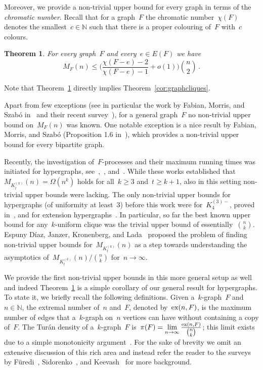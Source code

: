 \documentclass[reqno, 12pt]{amsart}
\numberwithin{equation}{section}
\numberwithin{figure}{section}
\theoremstyle{plain}
\newtheorem{theorem}{Theorem}[section]
\theoremstyle{note}
\theoremstyle{remark}
\def\ex{\text{\rm ex}}
\begin{document}
    Moreover, we provide a non-trivial upper bound for every graph in terms of the \textit{chromatic number}.
    Recall that for a graph~$F$ the chromatic number~$\chi(F)$ denotes the smallest~$c\in\mathds{N}$ such that there is a proper colouring of~$F$ with~$c$ colours.

    \begin{theorem}\label{thm:graphs}
        For every graph~$F$ and every~$e\in E(F)$ we have 
        \begin{equation*}
         M_F(n)\leq\bigg(\frac{\chi(F-e)-2}{\chi(F-e)-1}+o(1)\bigg)\binom{n}{2}\,.
        \end{equation*}
	\end{theorem}
    Note that Theorem~\ref{thm:graphs} directly implies Theorem~\ref{cor:graphcliques}.

    Apart from few exceptions (see in particular the work by Fabian, Morris, and Szab\'o in~\cite{FMS:25} and their recent survey~\cite{FMS:26}), for a general graph~$F$ no non-trivial upper bound on~$M_F(n)$ was known.
    One notable exception is a nice result by Fabian, Morris, and Szab\'o (Proposition 1.6 in~\cite{FMS:2508}), which provides a non-trivial upper bound for every bipartite graph.
    
	Recently, the investigation of~$F$-processes and their maximum running times was initiated for hypergraphs, see~\cite{NR:23},~\cite{HL:24}, and~\cite{EJKL:24}.
    While these works established that~$M_{K^{(k)}_t}(n)=\Omega(n^k)$ holds for all~$k\geq3$ and~$t\geq k+1$, also in this setting non-trivial upper bounds were lacking.
    The only non-trivial upper bounds for hypergraphs (of uniformity at least~$3$) before this work were for~$K_4^{(3)-}$, proved in~\cite{EJKL:24}, and for extension hypergraphs~\cite{LSZ:26}.
    In particular, so far the best known upper bound for any~$k$-uniform clique was the trivial upper bound of essentially~$\binom{n}{k}$.
    Espuny D\'iaz, Janzer, Kronenberg, and Lada~\cite{EJKL:24} proposed the problem of finding non-trivial upper bounds for~$M_{K^{(k)}_t}(n)$ as a step towards understanding the asymptotics of~$M_{K^{(k)}_t}(n)/\binom{n}{k}$ for~$n\to\infty$.
    
    We provide the first non-trivial upper bounds in this more general setup as well and indeed Theorem~\ref{thm:graphs} is a simple corollary of our general result for hypergraphs.
    To state it, we briefly recall the following definitions.
    Given a~$k$-graph~$F$ and~$n\in\mathds{N}$, the extremal number of~$n$ and~$F$, denoted by~$\ex(n,F)$, is the maximum number of edges that a~$k$-graph on~$n$ vertices can have without containing a copy of~$F$.
    The Tur\'an density of a~$k$-graph~$F$ is~$\pi(F)=\displaystyle\lim_{n\to\infty}\tfrac{\ex(n,F)}{\tbinom{n}{k}}$; this limit exists due to a simple monotonicity argument~\cite{KNS:64}.
    For the sake of brevity we omit an extensive discussion of this rich area and instead refer the reader to the surveys by F\"uredi~\cite{F:91}, Sidorenko~\cite{S:95}, and Keevash~\cite{K:11} for more background.
    
\end{document}
